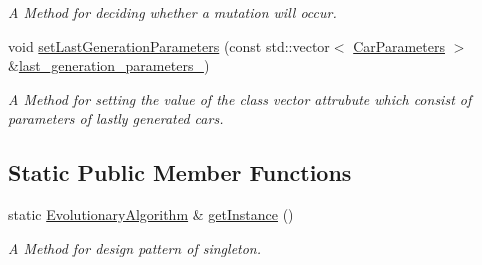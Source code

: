 \begin{DoxyCompactItemize}
\begin{DoxyCompactList}\small\item\em A Method for deciding whether a mutation will occur. \end{DoxyCompactList}\item 
void \hyperlink{classEvolutionaryAlgorithm_accd59515cc111edb66a030e7f8d79099}{set\+Last\+Generation\+Parameters} (const std\+::vector$<$ \hyperlink{classCarParameters}{Car\+Parameters} $>$ \&\hyperlink{classEvolutionaryAlgorithm_a85d23b07f2b2c8b1df581a9566111fa7}{last\+\_\+generation\+\_\+parameters\+\_\+})
\begin{DoxyCompactList}\small\item\em A Method for setting the value of the class vector attrubute which consist of parameters of lastly generated cars. \end{DoxyCompactList}\end{DoxyCompactItemize}
\subsection*{Static Public Member Functions}
\begin{DoxyCompactItemize}
\item 
static \hyperlink{classEvolutionaryAlgorithm}{Evolutionary\+Algorithm} \& \hyperlink{classEvolutionaryAlgorithm_a306ea15ca9a4eb67b84d22c7b24ef659}{get\+Instance} ()
\begin{DoxyCompactList}\small\item\em A Method for design pattern of singleton. \end{DoxyCompactList}\end{DoxyCompactItemize}
